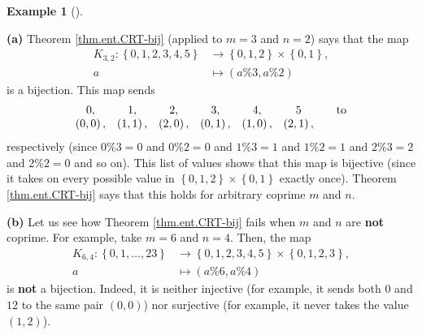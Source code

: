 \documentclass[numbers=enddot,12pt,final,onecolumn,notitlepage]{scrartcl}%
\numberwithin{exer}{subsection}
\theoremstyle{definition}
\newtheorem{exam}[theo]{Example}
\newenvironment{example}[1][]
{\begin{exam}[#1]\begin{leftbar}}
{\end{leftbar}\end{exam}}
\begin{document}
\begin{example}
\label{exa.ent.CRT-bij.exa1}\textbf{(a)} Theorem \ref{thm.ent.CRT-bij}
(applied to $m=3$ and $n=2$) says that the map%
\begin{align*}
K_{3,2}:\left\{  0,1,2,3,4,5\right\}   &  \rightarrow\left\{  0,1,2\right\}
\times\left\{  0,1\right\}  ,\\
a  &  \mapsto\left(  a\%3,a\%2\right)
\end{align*}
is a bijection. This map sends%
\[%
\begin{array}
[c]{cccccccc}%
0, & 1, & 2, & 3, & 4, & 5 &  & \text{to}\\
\left(  0,0\right)  , & \left(  1,1\right)  , & \left(  2,0\right)  , &
\left(  0,1\right)  , & \left(  1,0\right)  , & \left(  2,1\right)  , &  &
\end{array}
\]
respectively (since $0\%3=0$ and $0\%2=0$ and $1\%3=1$ and $1\%2=1$ and
$2\%3=2$ and $2\%2=0$ and so on). This list of values shows that this map is
bijective (since it takes on every possible value in $\left\{  0,1,2\right\}
\times\left\{  0,1\right\}  $ exactly once). Theorem \ref{thm.ent.CRT-bij}
says that this holds for arbitrary coprime $m$ and $n$.

\textbf{(b)} Let us see how Theorem \ref{thm.ent.CRT-bij} fails when $m$ and
$n$ are \textbf{not} coprime. For example, take $m=6$ and $n=4$. Then, the map%
\begin{align*}
K_{6,4}:\left\{  0,1,\ldots,23\right\}   &  \rightarrow\left\{
0,1,2,3,4,5\right\}  \times\left\{  0,1,2,3\right\}  ,\\
a  &  \mapsto\left(  a\%6,a\%4\right)
\end{align*}
is \textbf{not} a bijection. Indeed, it is neither injective (for example, it
sends both $0$ and $12$ to the same pair $\left(  0,0\right)  $) nor
surjective (for example, it never takes the value $\left(  1,2\right)  $).
\end{example}
\end{document}
